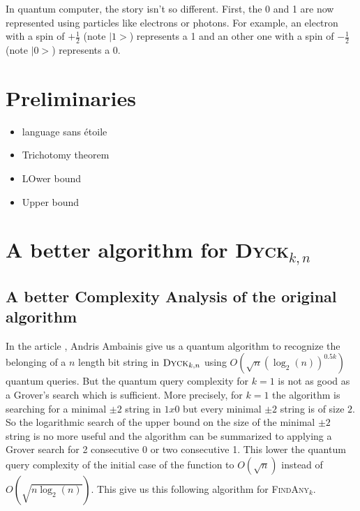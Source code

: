 \documentclass[11pt,a4paper]{article}
\newcommand{\Dyck}[1]{\textsc{Dyck$_{#1}$}}
\newcommand{\FA}[1]{\textsc{FindAny$_{#1}$}}
\theoremstyle{definition}
\theoremstyle{plain}
\theoremstyle{definition}
\begin{document}
In quantum computer, the story isn't so different. First, the 0 and 1 are
now represented using particles like electrons or photons. For example,
an electron with a spin of $+\frac{1}{2}$ (note $|1>$) represents a 1 and
an other one with a spin of $-\frac{1}{2}$ (note $|0>$) represents a 0.




\section{Preliminaries}

 {\color{red}
  \begin{itemize}
      \item language sans étoile
      \item Trichotomy theorem
      \item LOwer bound
      \item Upper bound
  \end{itemize}}



\section{A better algorithm for \Dyck{k,n}}

\subsection{A better Complexity Analysis of the original algorithm}

In the article \cite{art:2DGrid}, Andris Ambainis give us a quantum algorithm to recognize
the belonging of a $n$ length bit string in $\Dyck{k, n}$ using
$O(\sqrt{n}(\log_2(n))^{0.5k})$ quantum queries. But the quantum query complexity for $k=1$ is not as good as a
Grover's search which is sufficient. More precisely, for $k=1$ the algorithm is
searching for a minimal $\pm 2$ string in $1x0$ but every minimal $\pm 2$ string
is of size $2$. So the logarithmic search of the upper bound on the size of the
minimal $\pm 2$ string is no more useful and the algorithm can be summarized to
applying a Grover search for 2 consecutive 0 or two consecutive 1. This lower the quantum
query complexity of the initial case of the function to $O(\sqrt{n})$ instead of $O(\sqrt{n\log_2(n)})$.
This give us this following algorithm for \FA{k}.
\end{document}
